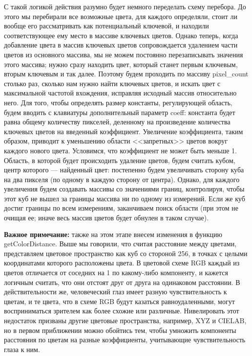 \documentclass[12pt]{article}
\begin{document}
{	С такой логикой действия разумно будет немного переделать схему перебора. До этого мы перебирали все возможные цвета, для каждого определяли, стоит ли вообще его рассматривать как потенциальный ключевой, и находили соответствующее ему место в массиве ключевых цветов. Однако теперь, когда добавление цвета в массив ключевых цветов сопровождается удалением части цветов из основного массива, мы не можем постоянно перезаписывать значения этого массива; нужно сразу находить цвет, который станет первым ключевым, вторым ключевым и так далее. Поэтому будем проходить по массиву pixel\_count столько раз, сколько нам нужно найти ключевых цветов, и искать цвет с максимальной частотой вхождения, исправляя исходный массив относительно него. Для того, чтобы определять размер константы, регулирующей область, будем вводить с клавиатуры дополнительный параметр coeff: константа будет равна общему количеству пикселей, деленному на произведение количества ключевых цветов на введенный коэффициент. Увеличение коэффициента, таким образом, приводит к уменьшению области <<запретных>> цветов вокруг каждого нового цвета. Условимся, что коэффициент не может быть меньше 1. Область, в которой будет происходить удаление цветов, будем считать кубом, центр которого --- найденный цвет: постепенно будем увеличивать сторону куба на два пикселя (по одному в каждую сторону от центра). Однако, для каждого увеличения будем создавать массивы со значениями границ, контролируя, чтобы этот куб не вышел за границы массива ни по одному из измерений. Если же куб достиг границы по всем измерениям, заканчиваем поиск области (при этом не очищая ее; иначе весь массив цветов будет обнулен в таком случае).
	
	{\bf Важное примечание: } также на этом этапе внесем изменения в функцию getColorDistance. Выше мы говорили, что считая расстояние между цветами, представляем цветовое пространство как куб со стороной 256, в точках с целыми координатами которого расположены цвета. В цветовой схеме RGB каждый из цветов отличается от соседних на 1 по какому-либо компоненту, и кажется логичным считать, что они отстоят друг от друга на одинаковом расстоянии. В действительности же, человеческий глаз имеет разную чувствительность к цветам, и те цвета, что в схеме RGB будут казаться равноудаленными, могут восприниматься зрителем как более схожие или различные. Нивелировать этот недостаток призваны другие цветовые пространства, например, XYZ и CIELAB, но в первом приближении можно обойтись тем, чтобы умножить компоненты расстояния по цветам на разные коэффициенты, учитывающие чувствительность глаза к ним.
	
}
\end{document}
